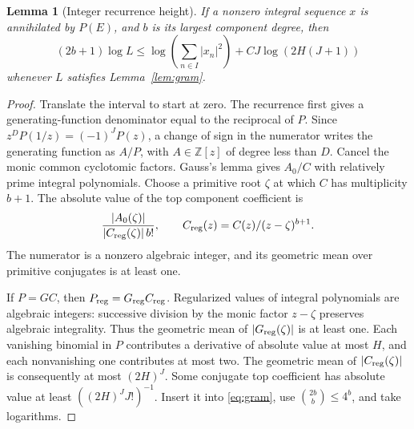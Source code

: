 \documentclass[11pt]{amsart}
\numberwithin{equation}{section}
\newtheorem{lemma}[theorem]{Lemma}
\theoremstyle{remark}
\newcommand{\Z}{\mathbb Z}
\begin{document}
\begin{lemma}[Integer recurrence height]\label{lem:integerheight}
If a nonzero integral sequence \(x\) is annihilated by \(P(E)\), and
\(b\) is its largest component degree, then
\begin{equation}\label{eq:integerheight}
 (2b+1)\log L\le
 \log\!\left(\sum_{n\in I}|x_n|^2\right)
 +CJ\log(2H(J+1))
\end{equation}
whenever \(L\) satisfies Lemma~\ref{lem:gram}.
\end{lemma}
\begin{proof}
Translate the interval to start at zero.
The recurrence first gives a generating-function denominator equal
to the reciprocal of \(P\). Since
\(z^D P(1/z)=(-1)^J P(z)\), a change of sign in the numerator writes
the generating function as \(A/P\), with \(A\in\Z[z]\) of degree less
than \(D\).
Cancel the monic common cyclotomic factors. Gauss's lemma gives
\(A_0/C\) with relatively prime integral polynomials. Choose a primitive root \(\zeta\) at which
\(C\) has multiplicity \(b+1\).
The absolute value of the top component coefficient is
\[
 \frac{|A_0(\zeta)|}{|C_{\rm reg}(\zeta)|\,b!},
 \qquad C_{\rm reg}(z)=C(z)/(z-\zeta)^{b+1}.
\]
The numerator is a nonzero algebraic integer, and its geometric mean
over primitive conjugates is at least one.

If \(P=GC\), then \(P_{\rm reg}=G_{\rm reg}C_{\rm reg}\).
Regularized values of integral polynomials are algebraic integers:
successive division by the monic factor \(z-\zeta\) preserves algebraic
integrality. Thus the geometric mean of \(|G_{\rm reg}(\zeta)|\)
is at least one. Each vanishing binomial in \(P\) contributes a derivative
of absolute value at most \(H\), and each nonvanishing one contributes
at most two. The geometric mean of \(|C_{\rm reg}(\zeta)|\) is consequently
at most \((2H)^J\). Some conjugate top coefficient has absolute value
at least \(((2H)^J J!)^{-1}\).
Insert it into \eqref{eq:gram}, use \(\binom{2b}{b}\le4^b\), and
take logarithms.
\end{proof}
\end{document}

